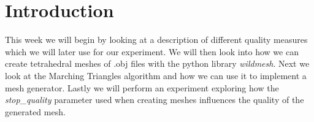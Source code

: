 \section{Introduction}
This week we will begin by looking at a description of different quality measures which we will later use for our experiment. We will then look into how we can create tetrahedral meshes of .obj files with the python library \textit{wildmesh}. Next we look at the Marching Triangles algorithm and how we can use it to implement a mesh generator. Lastly we will perform an experiment exploring how the \textit{stop\_quality} parameter used when creating meshes influences the quality of the generated mesh.